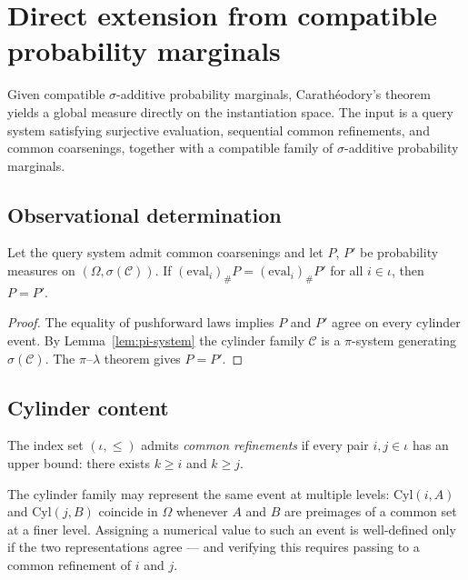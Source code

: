 \section{Direct extension from compatible probability marginals}
\label{sec:cara}

Given compatible $\sigma$-additive probability marginals, Carathéodory's theorem yields a global measure directly on the instantiation space.  The input is a query system satisfying surjective evaluation, sequential common refinements, and common coarsenings, together with a compatible family of $\sigma$-additive probability marginals.

\subsection{Observational determination}

\begin{proposition}
\label{thm:obs-determination}
Let the query system admit common coarsenings and let $P$, $P'$ be probability measures on $(\Omega, \sigma(\mathcal{C}))$.  If $(\mathrm{eval}_i)_\# P = (\mathrm{eval}_i)_\# P'$ for all $i \in \iota$, then $P = P'$.
\end{proposition}

\begin{proof}
The equality of pushforward laws implies $P$ and $P'$ agree on every cylinder event.  By Lemma~\ref{lem:pi-system} the cylinder family $\mathcal{C}$ is a $\pi$-system generating $\sigma(\mathcal{C})$.  The $\pi$--$\lambda$ theorem gives $P = P'$.
\end{proof}

\subsection{Cylinder content}

\begin{definition}
The index set $(\iota, \leq)$ admits \emph{common refinements} if every pair $i, j \in \iota$ has an upper bound: there exists $k \geq i$ and $k \geq j$.
\end{definition}

\noindent The cylinder family may represent the same event at multiple levels: $\mathrm{Cyl}(i, A)$ and $\mathrm{Cyl}(j, B)$ coincide in $\Omega$ whenever $A$ and $B$ are preimages of a common set at a finer level. Assigning a numerical value to such an event is well-defined only if the two representations agree --- and verifying this requires passing to a common refinement of $i$ and $j$.

